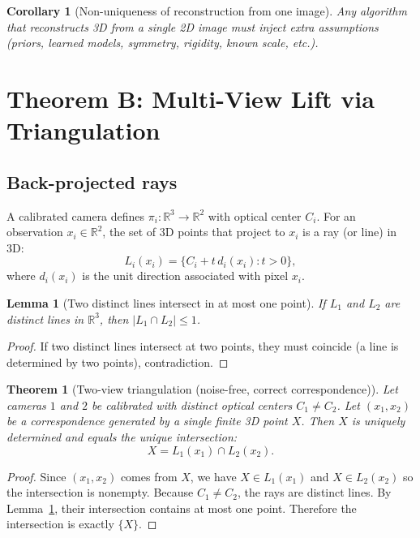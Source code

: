 \documentclass[11pt]{article}
\theoremstyle{definition}
\theoremstyle{plain}
\newtheorem{theorem}{Theorem}[section]
\newtheorem{lemma}{Lemma}[section]
\newtheorem{corollary}{Corollary}[section]
\theoremstyle{remark}
\begin{document}
\begin{corollary}[Non-uniqueness of reconstruction from one image]
Any algorithm that reconstructs 3D from a single 2D image must inject extra assumptions (priors, learned models, symmetry, rigidity, known scale, etc.).
\end{corollary}

\section{Theorem B: Multi-View Lift via Triangulation}

\subsection{Back-projected rays}
A calibrated camera defines $\pi_i:\mathbb{R}^3\to\mathbb{R}^2$ with optical center $C_i$.
For an observation $x_i\in\mathbb{R}^2$, the set of 3D points that project to $x_i$ is a ray (or line) in 3D:
\[
  L_i(x_i) = \{C_i + t\,d_i(x_i): t>0\},
\]
where $d_i(x_i)$ is the unit direction associated with pixel $x_i$.

\begin{lemma}[Two distinct lines intersect in at most one point]\label{lem:lines}
If $L_1$ and $L_2$ are distinct lines in $\mathbb{R}^3$, then $|L_1\cap L_2|\le 1$.
\end{lemma}

\begin{proof}
If two distinct lines intersect at two points, they must coincide (a line is determined by two points), contradiction.
\end{proof}

\begin{theorem}[Two-view triangulation (noise-free, correct correspondence)]\label{thm:B}
Let cameras $1$ and $2$ be calibrated with distinct optical centers $C_1\neq C_2$.
Let $(x_1,x_2)$ be a correspondence generated by a single finite 3D point $X$.
Then $X$ is uniquely determined and equals the unique intersection:
\[
  X = L_1(x_1)\cap L_2(x_2).
\]
\end{theorem}

\begin{proof}
Since $(x_1,x_2)$ comes from $X$, we have $X\in L_1(x_1)$ and $X\in L_2(x_2)$ so the intersection is nonempty.
Because $C_1\neq C_2$, the rays are distinct lines. By Lemma~\ref{lem:lines}, their intersection contains at most one point.
Therefore the intersection is exactly $\{X\}$.
\end{proof}
\end{document}
